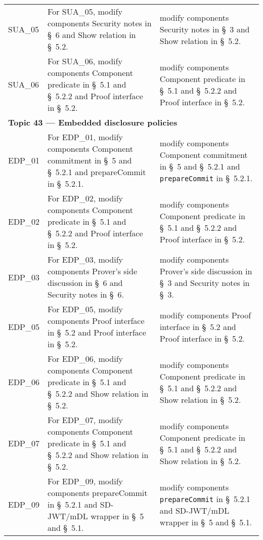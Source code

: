 \begin{landscape}
\begin{longtable}{p{3cm} p{10cm} p{7cm}}
SUA\_05 &
For SUA\_05, modify components Security notes in \S~6 and Show relation in \S~5.2. &
modify components Security notes in \S~3 and Show relation in \S~5.2. \\

SUA\_06 &
For SUA\_06, modify components Component predicate in \S~5.1 and \S~5.2.2 and Proof interface in \S~5.2. &
modify components Component predicate in \S~5.1 and \S~5.2.2 and Proof interface in \S~5.2. \\[1em]


\multicolumn{3}{l}{\textbf{Topic 43 — Embedded disclosure policies}}\\

EDP\_01 &
For EDP\_01, modify components Component commitment in \S~5 and \S~5.2.1 and prepareCommit in \S~5.2.1. &
modify components Component commitment in \S~5 and \S~5.2.1 and \texttt{prepareCommit} in \S~5.2.1. \\

EDP\_02 &
For EDP\_02, modify components Component predicate in \S~5.1 and \S~5.2.2 and Proof interface in \S~5.2. &
modify components Component predicate in \S~5.1 and \S~5.2.2 and Proof interface in \S~5.2. \\

EDP\_03 &
For EDP\_03, modify components Prover's side discussion in \S~6 and Security notes in \S~6. &
modify components Prover's side discussion in \S~3 and Security notes in \S~3. \\

EDP\_05 &
For EDP\_05, modify components Proof interface in \S~5.2 and Proof interface in \S~5.2. &
modify components Proof interface in \S~5.2 and Proof interface in \S~5.2. \\

EDP\_06 &
For EDP\_06, modify components Component predicate in \S~5.1 and \S~5.2.2 and Show relation in \S~5.2. &
modify components Component predicate in \S~5.1 and \S~5.2.2 and Show relation in \S~5.2. \\

EDP\_07 &
For EDP\_07, modify components Component predicate in \S~5.1 and \S~5.2.2 and Show relation in \S~5.2. &
modify components Component predicate in \S~5.1 and \S~5.2.2 and Show relation in \S~5.2. \\

EDP\_09 &
For EDP\_09, modify components prepareCommit in \S~5.2.1 and SD-JWT/mDL wrapper in \S~5 and \S~5.1. &
modify components \texttt{prepareCommit} in \S~5.2.1 and SD-JWT/mDL wrapper in \S~5 and \S~5.1. \\


\end{longtable}
\end{landscape}
